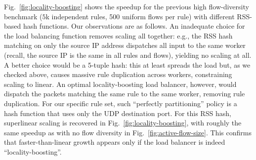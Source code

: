 Fig.~\ref{fig:locality-boosting} shows the speedup for the previous high flow-diversity benchmark ($5$k independent rules, 500 uniform flows per rule) with different RSS-based hash functions. Our observations are as follows. An inadequate choice for the load balancing function removes scaling all together: e.g., the RSS hash matching on only the source IP address dispatches all input to the same worker (recall, the source IP is the same in all rules and flows), yielding no scaling at all. A better choice would be a 5-tuple hash: this at least spreads the load but, as we checked above, causes massive rule duplication across workers, constraining scaling to linear.  An optimal locality-boosting load balancer, however, would dispatch the packets matching the same rule to the same worker, removing rule duplication. For our specific rule set, such ``perfectly partitioning'' policy is a hash function that uses only the UDP destination port. For this RSS hash, superlinear scaling is recovered in Fig.~\ref{fig:locality-boosting}, with roughly the same speedup as with no flow diversity in Fig.~\ref{fig:active-flow-size}.  This confirms that faster-than-linear growth appears only if the load balancer is indeed ``locality-boosting''. %


